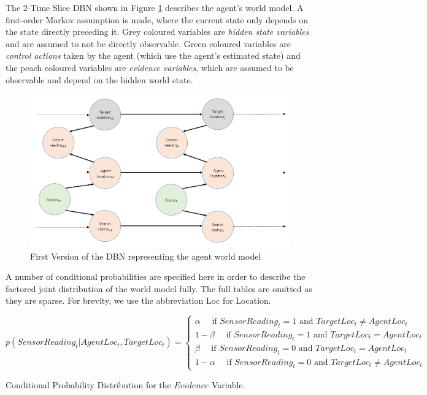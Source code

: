 The 2-Time Slice DBN shown in Figure \ref{fig:FirstDBNUsed} describes the agent's world model. A first-order Markov assumption is made, where the current state only depends on the state directly preceding it. Grey coloured variables are \textit{hidden state variables} and are assumed to not be directly observable. Green coloured variables are \textit{control actions} taken by the agent (which use the agent's estimated state) and the peach coloured variables are \textit{evidence variables}, which are assumed to be observable and depend on the hidden world state. 
\begin{figure}
    \centering
    \includegraphics[width = 0.8\linewidth]{Chapters/MultiAgentTargetDetection/Figs/DBNs/DBNWithMultipleObservable.PNG}
     \caption{First Version of the DBN representing the agent world model}
    \label{fig:FirstDBNUsed}
\end{figure}
A number of conditional probabilities are specified here in order to describe the factored joint distribution of the world model fully. The full tables are omitted as they are sparse. For brevity, we use the abbreviation Loc for Location.



\scriptsize
\begin{equation}\label{eqn:EvidenceVarsProbs}
    p(SensorReading_t | AgentLoc_{t}, TargetLoc_{t})  = 
    \begin{cases}
    \alpha \quad \text{ if } SensorReading_t=1 \text{ and } TargetLoc_t \neq AgentLoc_t
    \\
    1-\beta \quad \text{ if } SensorReading_t=1 \text{ and } TargetLoc_t = AgentLoc_t
    \\
    \beta \quad \text{ if } SensorReading_t=0 \text{ and } TargetLoc_t = AgentLoc_t
    \\
    1-\alpha \quad \text{ if } SensorReading_t=0 \text{ and } TargetLoc_t \neq AgentLoc_t
    \end{cases}
\end{equation}
\begin{center}
    \normalsize
    Conditional Probability Distribution for the $Evidence$ Variable.
\end{center}


